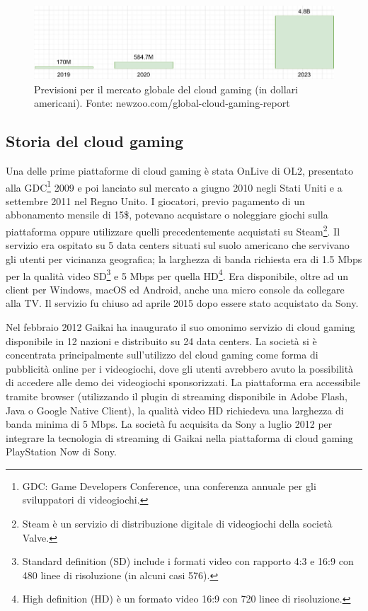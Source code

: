 \begin{figure}[H]
	\includegraphics[width=\linewidth]{immagini/Newzoo_Cloud_Gaming_Revenues}
	\caption{Previsioni per il mercato globale del cloud gaming (in dollari americani). Fonte: newzoo.com/global-cloud-gaming-report}
	\label{fig:Newzoo_Cloud_Gaming_Revenues}
\end{figure}



\subsection{Storia del cloud gaming} \label{StoriaDelCloudGaming}
Una delle prime piattaforme di cloud gaming è stata OnLive di OL2, presentato alla GDC\footnote{GDC: Game Developers Conference, una conferenza annuale per gli sviluppatori di videogiochi.} 2009 e poi lanciato sul mercato a giugno 2010 negli Stati Uniti e a settembre 2011 nel Regno Unito. I giocatori, previo pagamento di un abbonamento mensile di 15\$, potevano acquistare o noleggiare giochi sulla piattaforma oppure utilizzare quelli precedentemente acquistati su Steam\footnote{Steam è un servizio di distribuzione digitale di videogiochi della società Valve.}. Il servizio era ospitato su 5 data centers situati sul suolo americano che servivano gli utenti per vicinanza geografica; la larghezza di banda richiesta era di 1.5 Mbps per la qualità video SD\footnote{Standard definition (SD) include i formati video con rapporto 4:3 e 16:9 con 480 linee di risoluzione (in alcuni casi 576).} e 5 Mbps per quella HD\footnote{High definition (HD) è un formato video 16:9 con 720 linee di risoluzione.}. Era disponibile, oltre ad un client per Windows, macOS ed Android, anche una micro console da collegare alla TV. Il servizio fu chiuso ad aprile 2015 dopo essere stato acquistato da Sony\cite{Cloud_gaming_history}.

Nel febbraio 2012 Gaikai ha inaugurato il suo omonimo servizio di cloud gaming disponibile in 12 nazioni e distribuito su 24 data centers. La società si è concentrata principalmente sull'utilizzo del cloud gaming come forma di pubblicità online per i videogiochi, dove gli utenti avrebbero avuto la possibilità di accedere alle demo dei videogiochi sponsorizzati. La piattaforma era accessibile tramite browser (utilizzando il plugin di streaming disponibile in Adobe Flash, Java o Google Native Client), la qualità video HD richiedeva una larghezza di banda minima di 5 Mbps. La società fu acquisita da Sony a luglio 2012 per integrare la tecnologia di streaming di Gaikai nella piattaforma di cloud gaming PlayStation Now di Sony\cite{Gaikai_Beta}.

